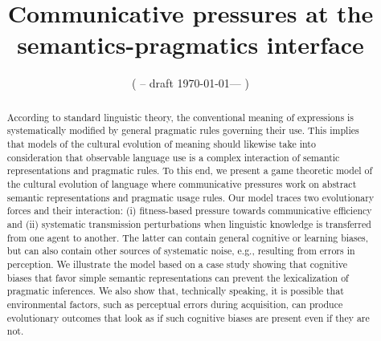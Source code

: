 \documentclass[a4paper]{article}
\title{Communicative pressures at the semantics-pragmatics interface}
\author{%
    ( -- draft \today --- )
}
\date{}
\begin{document}
\maketitle

\begin{abstract}
According to standard linguistic theory, the conventional meaning of expressions is systematically modified by general pragmatic rules governing their use. This implies that models of the cultural evolution of meaning should likewise take into consideration that observable language use is a complex interaction of semantic representations and pragmatic rules. To this end, we present a game theoretic model of the cultural evolution of language where communicative pressures work on abstract semantic representations and pragmatic usage rules. Our model traces two evolutionary forces and their interaction: (i) fitness-based pressure towards communicative efficiency and (ii) systematic transmission perturbations when linguistic knowledge is transferred from one agent to another. The latter can contain general cognitive or learning biases, but can also contain other sources of systematic noise, e.g., resulting from errors in perception. We illustrate the model based on a case study showing that cognitive biases that favor simple semantic representations can prevent the lexicalization of pragmatic inferences. We also show that, technically speaking, it is possible that environmental factors, such as perceptual errors during acquisition, can produce evolutionary outcomes that look as if such cognitive biases are present even if they are not. 
\end{abstract}

\end{document}
